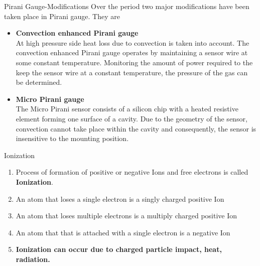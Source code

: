 \documentclass[11pt]{beamer}
\begin{document}
\begin{frame}{Pirani Gauge-Modifications}
Over the period two major modifications have been taken place in Pirani gauge. They are 
\begin{itemize}
\item \textbf{Convection enhanced Pirani gauge}\\
At high pressure side heat loss due to convection is taken into account.
The convection enhanced Pirani gauge operates by maintaining a sensor wire at some constant temperature.
Monitoring the amount of power required to the keep the sensor wire at a constant temperature, the pressure of the gas can be determined. 


\item \textbf{Micro Pirani gauge}\\
 The Micro Pirani sensor consists of a silicon chip with a heated resistive element forming one surface of a cavity. 
 Due to the geometry of the sensor, convection cannot take place within the cavity and consequently, the sensor is insensitive to the mounting position. 
\end{itemize}

 


\end{frame}

\begin{frame}{Ionization}

\begin{exampleblock}


\begin{enumerate}
		\item Process of formation of positive or negative Ions and free electrons is called \textbf{Ionization}.
\item An atom that loses a single electron is a singly charged positive Ion
\item An atom that loses multiple electrons is a multiply charged positive Ion
\item An atom that that is attached with a single electron is a negative Ion
\item \textbf{Ionization can occur due to \alert{charged particle impact}, heat, radiation.}

		
\end{enumerate}

\end{exampleblock}		


\end{frame}
\end{document}
